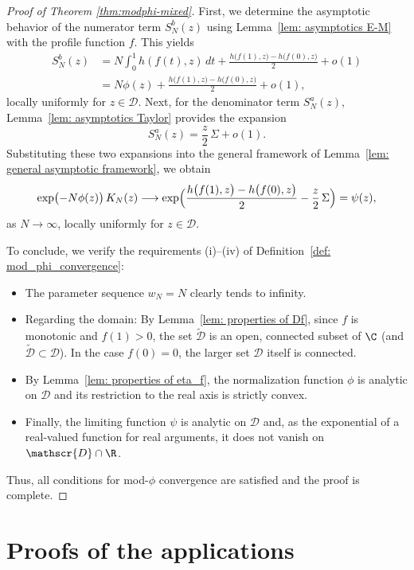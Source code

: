 \documentclass[11pt,a4paper]{scrartcl}
\numberwithin{equation}{section}
\theoremstyle{plain}
\theoremstyle{definition}
\theoremstyle{remark}
\newenvironment{proofof}[1]{\begin{proof}[Proof of #1]}{\end{proof}}
\begin{document}
\begin{proofof}{Theorem {\ref{thm:modphi-mixed}}}
First, we determine the asymptotic behavior of the numerator term $S_N^{b}(z)$ using Lemma~\ref{lem: asymptotics E-M} with the profile function $f$. This yields
\begin{align*}
S_N^{b}(z) &= N \int_0^1 h(f(t),z)\,dt + \frac{h\bigl(f(1),z\bigr) - h\bigl(f(0),z\bigr)}{2} + o(1)\\
&= N\phi(z) + \frac{h\bigl(f(1),z\bigr) - h\bigl(f(0),z\bigr)}{2} + o(1),
\end{align*}
locally uniformly for $z \in \mathscr{D}$.
Next, for the denominator term $S_N^{a}(z)$, Lemma~\ref{lem: asymptotics Taylor} provides the expansion
\[
S_N^{a}(z) = \frac{z}{2}\,\Sigma + o(1).
\]
Substituting these two expansions into the general framework of Lemma~\ref{lem: general asymptotic framework}, we obtain
\[
\exp\bigl(-N\phi(z)\bigr)\,K_N(z) \longrightarrow \exp\Bigl(\frac{h\bigl(f(1),z\bigr) - h\bigl(f(0),z\bigr)}{2} - \frac{z}{2}\,\Sigma\Bigr) = \psi(z),
\]
as $N\to\infty$, locally uniformly for $z\in \mathscr{D}$.

To conclude, we verify the requirements (i)--(iv) of Definition~\ref{def: mod_phi_convergence}:
\begin{itemize}
	\item[(i)] The parameter sequence $w_N = N$ clearly tends to infinity.
	\item[(ii)] Regarding the domain: By Lemma~\ref{lem: properties of Df}, since $f$ is monotonic and $f(1)>0$, the set $\widetilde{\mathscr{D}}$ is an open, connected subset of $\C$ (and $\widetilde{\mathscr{D}}\subset \mathscr{D}$). In the case $f(0)=0$, the larger set $\mathscr{D}$ itself is connected.
	\item[(iii)] By Lemma~\ref{lem: properties of eta_f}, the normalization function $\phi$ is analytic on $\mathscr{D}$ and its restriction to the real axis is strictly convex.
	\item[(iv)] Finally, the limiting function $\psi$ is analytic on $\mathscr{D}$ and, as the exponential of a real-valued function for real arguments, it does not vanish on $\mathscr{D}\cap\R$.
\end{itemize}
Thus, all conditions for mod-$\phi$ convergence are satisfied and the proof is complete.
\end{proofof}

\section{Proofs of the applications}\label{sec:proofs_app}
\end{document}
